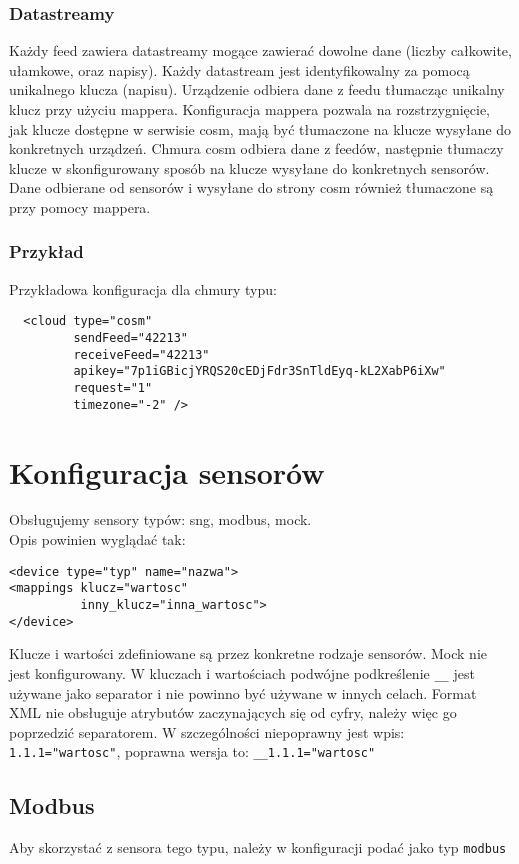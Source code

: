 \documentclass[11pt]{article}
\begin{document}
\subsubsection{Datastreamy}
Każdy feed zawiera datastreamy mogące zawierać dowolne dane (liczby całkowite, ułamkowe, oraz napisy). Każdy datastream jest identyfikowalny za pomocą unikalnego klucza (napisu). Urządzenie odbiera dane z feedu tłumacząc unikalny klucz przy użyciu mappera. Konfiguracja mappera pozwala na rozstrzygnięcie, jak klucze dostępne w serwisie cosm, mają być tłumaczone na klucze wysyłane do konkretnych urządzeń. Chmura cosm odbiera dane z feedów, następnie tłumaczy klucze w skonfigurowany sposób na klucze wysyłane do konkretnych sensorów.
Dane odbierane od sensorów i wysyłane do strony cosm również tłumaczone są przy pomocy mappera.

\subsubsection{Przykład}

Przykładowa konfiguracja dla chmury typu:
\begin{verbatim}
  <cloud type="cosm" 
         sendFeed="42213" 
         receiveFeed="42213" 
         apikey="7p1iGBicjYRQS20cEDjFdr3SnTldEyq-kL2XabP6iXw"
         request="1"
         timezone="-2" />
\end{verbatim}

\section{Konfiguracja sensorów}
Obsługujemy sensory typów: sng, modbus, mock.\\

Opis powinien wyglądać tak:
\begin{verbatim}
<device type="typ" name="nazwa">
<mappings klucz="wartosc"
          inny_klucz="inna_wartosc">
</device>
\end{verbatim}

Klucze i wartości zdefiniowane są przez konkretne rodzaje sensorów. Mock nie jest konfigurowany.
W kluczach i wartościach podwójne podkreślenie \verb|__| jest używane jako separator i nie
powinno być używane w innych celach. Format XML nie obsługuje atrybutów zaczynających się od cyfry,
należy więc go poprzedzić separatorem. W szczególności niepoprawny jest wpis: \verb|1.1.1="wartosc"|,
poprawna wersja to: \verb|__1.1.1="wartosc"|


\subsection{Modbus}
Aby skorzystać z sensora tego typu, należy w konfiguracji podać jako typ \verb|modbus|
\end{document}
